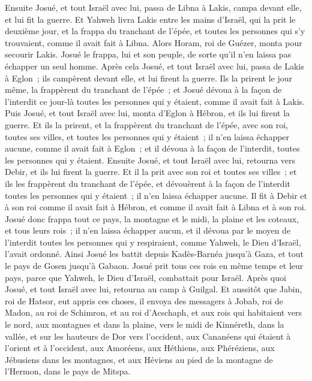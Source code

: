 \begin{multicols}{2}
Ensuite Josué, et tout Israël avec lui, passa de Libna à Lakis, campa devant elle, et lui fit la guerre.
Et Yahweh livra Lakis entre les mains d'Israël, qui la prit le deuxième jour, et la frappa du tranchant de l'épée, et toutes les personnes qui s'y trouvaient, comme il avait fait à Libna.
Alors Horam, roi de Guézer, monta pour secourir Lakis. Josué le frappa, lui et son peuple, de sorte qu'il n'en laissa pas échapper un seul homme.
Après cela Josué, et tout Israël avec lui, passa de Lakis à Eglon~; ils campèrent devant elle, et lui firent la guerre.
Ils la prirent le jour même, la frappèrent du tranchant de l'épée~; et Josué dévoua à la façon de l'interdit ce jour-là toutes les personnes qui y étaient, comme il avait fait à Lakis.
Puis Josué, et tout Israël avec lui, monta d'Eglon à Hébron, et ils lui firent la guerre.
Et ils la prirent, et la frappèrent du tranchant de l'épée, avec son roi, toutes ses villes, et toutes les personnes qui y étaient~; il n'en laissa échapper aucune, comme il avait fait à Eglon~; et il dévoua à la façon de l'interdit, toutes les personnes qui y étaient.
Ensuite Josué, et tout Israël avec lui, retourna vers Debir, et ils lui firent la guerre.
Et il la prit avec son roi et toutes ses villes~; et ils les frappèrent du tranchant de l'épée, et dévouèrent à la façon de l'interdit toutes les personnes qui y étaient~; il n'en laissa échapper aucune. Il fit à Debir et à son roi comme il avait fait à Hébron, et comme il avait fait à Libna et à son roi.
Josué donc frappa tout ce pays, la montagne et le midi, la plaine et les coteaux, et tous leurs rois~; il n'en laissa échapper aucun, et il dévoua par le moyen de l'interdit toutes les personnes qui y respiraient, comme Yahweh, le Dieu d'Israël, l'avait ordonné.
Ainsi Josué les battit depuis Kadès-Barnéa jusqu'à Gaza, et tout le pays de Gosen jusqu'à Gabaon.
Josué prit tous ces rois en même temps et leur pays, parce que Yahweh, le Dieu d'Israël, combattait pour Israël.
Après quoi Josué, et tout Israël avec lui, retourna au camp à Guilgal.
\VerseOne{}Et aussitôt que Jabin, roi de Hatsor, eut appris ces choses, il envoya des messagers à Jobab, roi de Madon, au roi de Schimron, et au roi d'Acschaph,
et aux rois qui habitaient vers le nord, aux montagnes et dans la plaine, vers le midi de Kinnéreth, dans la vallée, et sur les hauteurs de Dor vers l'occident,
aux Cananéens qui étaient à l'orient et à l'occident, aux Amoréens, aux Héthiens, aux Phéréziens, aux Jébusiens dans les montagnes, et aux Héviens au pied de la montagne de l'Hermon, dans le pays de Mitspa.

\end{multicols}
